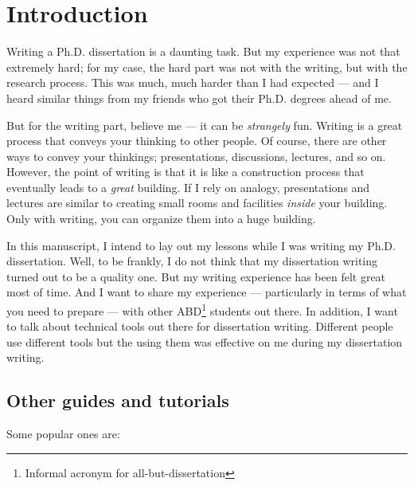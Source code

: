 \documentclass[11pt]{article}
\begin{document}
\section{Introduction}

Writing a Ph.D. dissertation is a daunting task. But my experience was not
that extremely hard; for my case, the hard part was not with the writing, but
with the research process. This was much, much harder than I had expected ---
and I heard similar things from my friends who got their Ph.D. degrees ahead
of me.

But for the writing part, believe me --- it can be \emph{strangely} fun.
Writing is a great process that conveys your thinking to other people.  Of
course, there are other ways to convey your thinkings; presentations,
discussions, lectures, and so on.  However, the point of writing is that it is
like a construction process that eventually leads to a \emph{great} building.
If I rely on analogy, presentations and lectures are similar to creating small
rooms and facilities \emph{inside} your building. Only with writing, you can
organize them into a huge building.

In this manuscript, I intend to lay out my lessons while I was writing my
Ph.D.  dissertation. Well, to be frankly, I do not think that my dissertation
writing turned out to be a quality one. But my writing experience has been
felt great most of time. And I want to share my experience --- particularly in
terms of what you need to prepare --- with other ABD\footnote{Informal acronym
for all-but-dissertation} students out there. In addition, I want to talk
about technical tools out there for dissertation writing.  Different people
use different tools but the using them was effective on me during my
dissertation writing. 

\subsection{Other guides and tutorials}
Some popular ones are:
\end{document}

